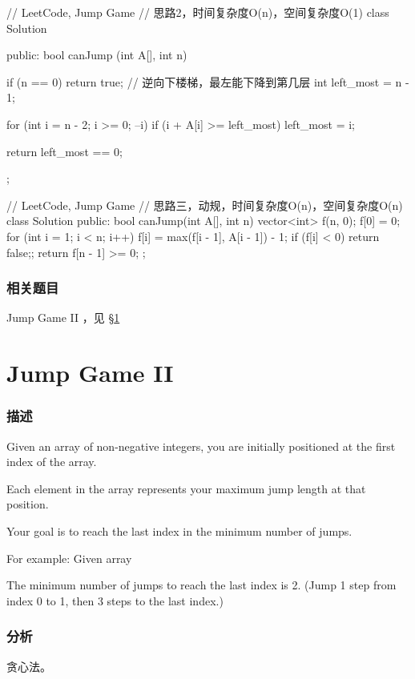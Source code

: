 \begin{Code}
// LeetCode, Jump Game
// 思路2，时间复杂度O(n)，空间复杂度O(1)
class Solution {
public:
    bool canJump (int A[], int n) {
        if (n == 0) return true;
        // 逆向下楼梯，最左能下降到第几层
        int left_most = n - 1;

        for (int i = n - 2; i >= 0; --i)
            if (i + A[i] >= left_most)
                left_most = i;

        return left_most == 0;
    }
};
\end{Code}

\begin{Code}
// LeetCode, Jump Game
// 思路三，动规，时间复杂度O(n)，空间复杂度O(n)
class Solution {
public:
    bool canJump(int A[], int n) {
        vector<int> f(n, 0);
        f[0] = 0;
        for (int i = 1; i < n; i++) {
            f[i] = max(f[i - 1], A[i - 1]) - 1;
            if (f[i] < 0) return false;;
        }
        return f[n - 1] >= 0;
    }
};
\end{Code}


\subsubsection{相关题目}
\begindot
\item Jump Game II ，见 \S \ref{sec:jump-game-ii}
\myenddot


\section{Jump Game II} %
\label{sec:jump-game-ii}


\subsubsection{描述}
Given an array of non-negative integers, you are initially positioned at the first index of the array.

Each element in the array represents your maximum jump length at that position.

Your goal is to reach the last index in the minimum number of jumps.

For example:
Given array 

The minimum number of jumps to reach the last index is 2. (Jump 1 step from index 0 to 1, then 3 steps to the last index.)


\subsubsection{分析}
贪心法。


